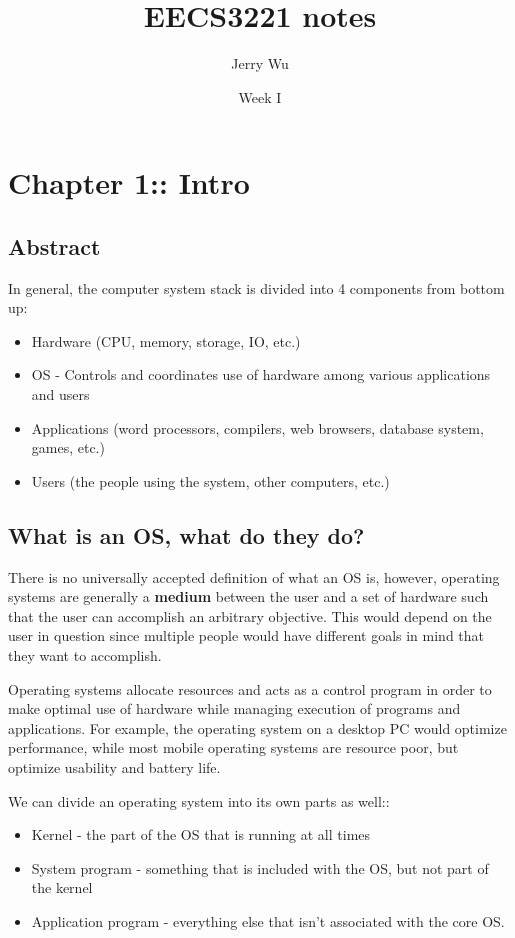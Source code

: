 \documentclass[12pt]{book}
\title{EECS3221 notes}
\author{Jerry Wu}
\date{Week I}
\begin{document}
\maketitle

\chapter*{Chapter 1:: Intro}

\section*{Abstract}

In general, the computer system stack is divided into 4 components from bottom up:

\begin{itemize}
    \item Hardware (CPU, memory, storage, IO, etc.)
    \item OS - Controls and coordinates use of hardware among various applications and users
    \item Applications (word processors, compilers, web browsers, database system, games, etc.)
    \item Users (the people using the system, other computers, etc.)
\end{itemize}

\section*{What is an OS, what do they do?}
There is no universally accepted definition of what an OS is, however, operating systems are generally a \textbf{medium} between the user and a set of hardware such that the user can accomplish an arbitrary objective. This would depend on the user in question since multiple people would have different goals in mind that they want to accomplish. 

Operating systems allocate resources and acts as a control program in order to make optimal use of hardware while managing execution of programs and applications. For example, the operating system on a desktop PC would optimize performance, while most mobile operating systems are resource poor, but optimize usability and battery life.

We can divide an operating system into its own parts as well::

\begin{itemize}
    \item Kernel - the part of the OS that is running at all times
    \item System program - something that is included with the OS, but not part of the kernel
    \item Application program - everything else that isn't associated with the core OS.
\end{itemize}
\end{document}
